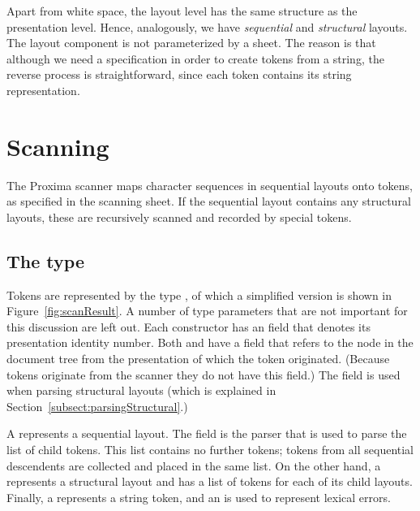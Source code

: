\documentclass{article}[10pt]
\begin{document}
Apart from white space, the layout level has the same structure as the presentation level. Hence, analogously, we have {\em sequential} and {\em structural} layouts. The layout component is not parameterized by a sheet. The reason is that although we need a specification in order to create tokens from a string, the reverse process is straightforward, since each token contains its string representation.  





%
\section{Scanning}\label{sect:scanner}
%

The Proxima scanner maps character sequences in sequential layouts onto tokens, as specified in the scanning sheet. If the sequential layout contains any structural layouts, these are recursively scanned and recorded by special tokens.

\subsection{The  type}

Tokens are represented by the type , of which a simplified version is shown in Figure~\ref{fig:scanResult}. A number of type parameters that are not important for this discussion are left out. Each constructor has an  field that denotes its presentation identity number. Both  and  have a  field that refers to the node in the document tree from the presentation of which the token originated. (Because  tokens originate from the scanner they do not have this field.) The  field is used when parsing structural layouts (which is explained in Section~\ref{subsect:parsingStructural}.) 



A {\bf{}} represents a sequential layout. The  field is the parser that is used to parse the list of child tokens. This list contains no further  tokens; tokens from all sequential descendents are collected and placed in the same list. On the other hand, a {\bf {}} represents a structural layout and has a list of tokens for each of its child layouts. Finally, a {\bf {}} represents a string token, and an {\bf {}} is used to represent lexical errors. %
\end{document}

